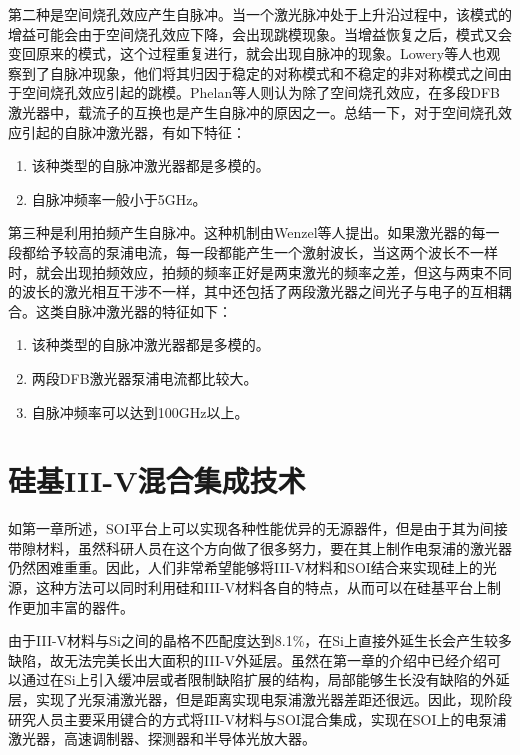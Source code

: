 第二种是空间烧孔效应产生自脉冲。当一个激光脉冲处于上升沿过程中，该模式的增益可能会由于空间烧孔效应下降，会出现跳模现象。当增益恢复之后，模式又会变回原来的模式，这个过程重复进行，就会出现自脉冲的现象。Lowery等人\cite{lowery1994improving}也观察到了自脉冲现象，他们将其归因于稳定的对称模式和不稳定的非对称模式之间由于空间烧孔效应引起的跳模。Phelan等人则认为除了空间烧孔效应，在多段DFB激光器中，载流子的互换也是产生自脉冲的原因之一。总结一下，对于空间烧孔效应引起的自脉冲激光器，有如下特征：

\begin{enumerate}
	\item 
	该种类型的自脉冲激光器都是多模的。
	\item 
	自脉冲频率一般小于5GHz。
\end{enumerate}

第三种是利用拍频产生自脉冲。这种机制由Wenzel等人\cite{wenzel1996mechanisms}提出。如果激光器的每一段都给予较高的泵浦电流，每一段都能产生一个激射波长，当这两个波长不一样时，就会出现拍频效应，拍频的频率正好是两束激光的频率之差，但这与两束不同的波长的激光相互干涉不一样，其中还包括了两段激光器之间光子与电子的互相耦合。这类自脉冲激光器的特征如下：

\begin{enumerate}
	\item 
	该种类型的自脉冲激光器都是多模的。
	\item 
	两段DFB激光器泵浦电流都比较大。
	\item 
	自脉冲频率可以达到100GHz以上。
\end{enumerate}

\section{硅基III-V混合集成技术}
如第一章所述，SOI平台上可以实现各种性能优异的无源器件，但是由于其为间接带隙材料，虽然科研人员在这个方向做了很多努力\cite{wirths2015lasing}，要在其上制作电泵浦的激光器仍然困难重重。因此，人们非常希望能够将III-V材料和SOI结合来实现硅上的光源，这种方法可以同时利用硅和III-V材料各自的特点，从而可以在硅基平台上制作更加丰富的器件。

由于III-V材料与Si之间的晶格不匹配度达到8.1\%，在Si上直接外延生长会产生较多缺陷，故无法完美长出大面积的III-V外延层。虽然在第一章的介绍中已经介绍可以通过在Si上引入缓冲层或者限制缺陷扩展的结构，局部能够生长没有缺陷的外延层，实现了光泵浦激光器\cite{wang2015room}，但是距离实现电泵浦激光器差距还很远。因此，现阶段研究人员主要采用键合的方式将III-V材料与SOI混合集成，实现在SOI上的电泵浦激光器，高速调制器、探测器和半导体光放大器\cite{liang2010hybrid,roelkens2010iii,liang2010recent,duan2014hybrid}。

